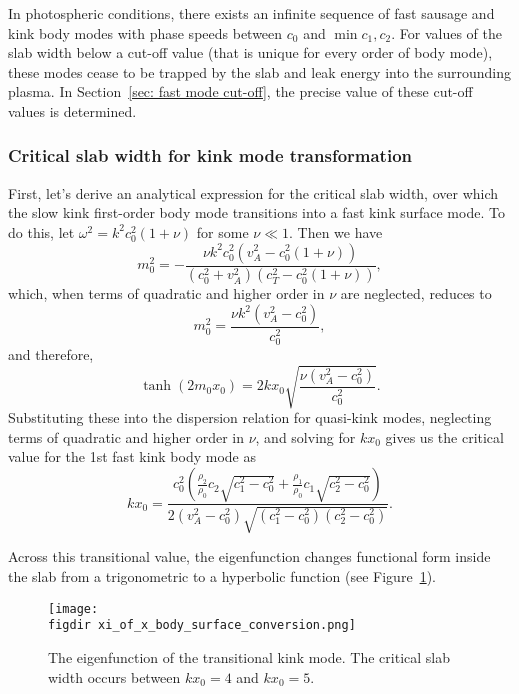 \documentclass[12pt]{../style-files/ociamthesis}
\begin{document}
In photospheric conditions, there exists an infinite sequence of fast sausage and kink body modes with phase speeds between $c_0$ and $\min{c_1, c_2}$. For values of the slab width below a cut-off value (that is unique for every order of body mode), these modes cease to be trapped by the slab and leak energy into the surrounding plasma. In Section~\ref{sec: fast mode cut-off}, the precise value of these cut-off values is determined.


\subsubsection{Critical slab width for kink mode transformation} \label{sec: critical slab width}
First, let's derive an analytical expression for the critical slab width, over which the slow kink first-order body mode transitions into a fast kink surface mode. To do this, let $\omega^2 = k^2c_0^2(1 + \nu)$ for some $\nu \ll 1$. Then we have
\begin{equation}
m_0^2 = -\frac{\nu k^2c_0^2(v_A^2 - c_0^2(1 + \nu))}{(c_0^2 + v_A^2)(c_T^2 - c_0^2(1 + \nu))},
\end{equation}
which, when terms of quadratic and higher order in $\nu$ are neglected, reduces to
\begin{equation}
m_0^2 = \frac{\nu k^2(v_A^2 - c_0^2)}{c_0^2},
\end{equation}
and therefore,
\begin{equation}
\tanh(2m_0x_0) = 2kx_0\sqrt{\frac{\nu(v_A^2 - c_0^2)}{c_0^2}}.
\end{equation}
Substituting these into the dispersion relation for quasi-kink modes, neglecting terms of quadratic and higher order in $\nu$, and solving for $kx_0$ gives us the critical value for the 1st fast kink body mode as
\begin{equation}
kx_0 = \frac{c_0^2 \left(\frac{\rho_2}{\rho_0}c_2\sqrt{c_1^2 - c_0^2} + \frac{\rho_1}{\rho_0}c_1\sqrt{c_2^2 - c_0^2}\right)}{2(v_A^2 - c_0^2)\sqrt{(c_1^2 - c_0^2)(c_2^2 - c_0^2)}}.
\end{equation}

Across this transitional value, the eigenfunction changes functional form inside the slab from a trigonometric to a hyperbolic function (see Figure~\ref{fig: transitional kink eigenfunction}). 
\begin{figure}
	\centering
	\texttt{[image: \\figdir xi\_of\_x\_body\_surface\_conversion.png]}
	\caption{The eigenfunction of the transitional kink mode. The critical slab width occurs between $kx_0 = 4$ and $kx_0 = 5$.}
	\label{fig: transitional kink eigenfunction}
\end{figure}
\end{document}
